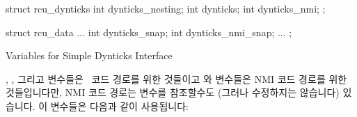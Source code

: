 \fi

\begin{listing}[tbp]
\begin{VerbatimL}
struct rcu_dynticks {
	int dynticks_nesting;
	int dynticks;
	int dynticks_nmi;
};

struct rcu_data {
	...
	int dynticks_snap;
	int dynticks_nmi_snap;
	...
};
\end{VerbatimL}
\caption{Variables for Simple Dynticks Interface}
\label{lst:formal:Variables for Simple Dynticks Interface}
\end{listing}

, , 그리고  변수들은 \IRQ\
코드 경로를 위한 것들이고  와  변수들은
NMI 코드 경로를 위한 것들입니다만, NMI 코드 경로는  변수를
참조할수도 (그러나 수정하지는 않습니다) 있습니다.
이 변수들은 다음과 같이 사용됩니다:

\iffalse

The \co{dynticks_nesting}, \co{dynticks}, and \co{dynticks_snap} variables
are for the \IRQ\ code paths, and the \co{dynticks_nmi} and
\co{dynticks_nmi_snap} variables are for the NMI code paths, although
the NMI code path will also reference (but not modify) the
\co{dynticks_nesting} variable.
These variables are used as follows:

\fi


